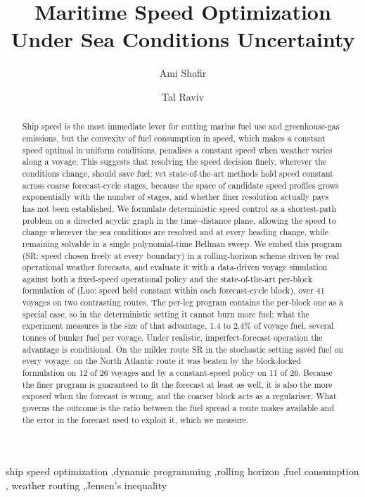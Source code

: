 \documentclass[review,authoryear]{elsarticle}
\begin{document}
\begin{frontmatter}

\title{Maritime Speed Optimization Under Sea Conditions Uncertainty}

\author[tau]{Ami Shafir}
\author[tau]{Tal Raviv}
\address[tau]{Faculty of Engineering, Tel Raviv University, Tel Aviv, Israel}

\begin{abstract}
Ship speed is the most immediate lever for cutting marine fuel use and greenhouse-gas emissions, but
the convexity of fuel consumption in speed, which makes a constant speed optimal in uniform
conditions, penalises a constant speed when weather varies along a voyage. This suggests that
resolving the speed decision finely, wherever the conditions change, should save fuel; yet
state-of-the-art methods hold
speed constant across coarse forecast-cycle stages, because the space of candidate speed profiles grows
exponentially with the number of stages, and whether finer resolution actually pays has not been
established. We formulate deterministic speed control as a shortest-path problem on a directed acyclic
graph in the time--distance plane, allowing the speed to change wherever the sea conditions are
resolved and at every heading change, while remaining solvable in a single polynomial-time Bellman
sweep. We embed this
program (SR: speed chosen freely at every boundary) in a rolling-horizon scheme driven by real
operational weather forecasts, and evaluate it with a data-driven voyage simulation against both a
fixed-speed operational policy and the state-of-the-art per-block formulation of \citet{luo2024} (Luo:
speed held constant within each forecast-cycle block), over 41 voyages on two contrasting routes.
The per-leg program contains the per-block one as a special case, so in the deterministic setting it cannot
burn more fuel; what the experiment measures is the size of that advantage, 1.4 to 2.4\% of voyage
fuel, several tonnes of bunker fuel per voyage. Under realistic, imperfect-forecast operation the
advantage is conditional. On the milder route SR in the stochastic setting saved fuel on every voyage; on the
North Atlantic route it was beaten by the block-locked formulation on 12 of 26 voyages and by a
constant-speed policy on 11 of 26. Because the finer program is guaranteed to fit the forecast at
least as well, it is also the more exposed when the forecast is wrong, and the coarser block acts as
a regulariser. What governs the outcome is the ratio between the fuel spread a route makes available
and the error in the forecast used to exploit it, which we measure.
\end{abstract}

\begin{keyword}
ship speed optimization \sep dynamic programming \sep rolling horizon \sep fuel consumption \sep
weather routing \sep Jensen's inequality
\end{keyword}

\end{frontmatter}
\end{document}
